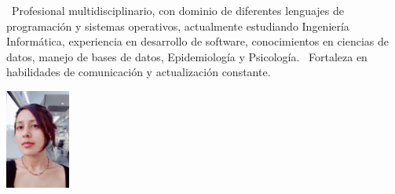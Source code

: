 \documentclass{resume} %
\begin{document}




\setlength{\tabcolsep}{100pt} %

\begin{minipage}{0.81\textwidth}
    
{\ Profesional multidisciplinario, con dominio de diferentes lenguajes de programación y sistemas operativos,  actualmente estudiando Ingeniería Informática,  experiencia en desarrollo de software, conocimientos en ciencias de datos, manejo de bases de datos, Epidemiología y Psicología.} 
{\ Fortaleza en habilidades de comunicación y actualización constante.} 
\hspace{100cm} %
\end{minipage}
\begin{minipage}{0.19\textwidth}
\begin{center}
\includegraphics[width=80px]{photo4.jpg}
\end{center}
\end{minipage}
\end{document}
